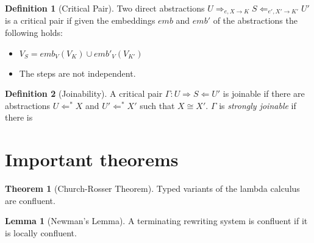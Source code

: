 \documentclass[12pt]{article}
\theoremstyle{definition}
\newtheorem{theorem}{Theorem}
\newtheorem{lemma}{Lemma}
\newtheorem{definition}{Definition}
\begin{document}
\begin{definition}[Critical Pair]
Two direct abstractions $U \Rightarrow_{e, X \rightarrow K} S \Leftarrow_{e', X' \rightarrow K'} U'$ is a critical pair if given the embeddings $emb$ and $emb'$ of the abstractions the following holds:
\begin{itemize}
\item $V_S = emb_V(V_K) \cup emb'_V(V_{K'})$
\item The steps are not independent.
\end{itemize}
\end{definition}

\begin{definition}[Joinability]
A critical pair $\Gamma: U \Rightarrow S \Leftarrow U'$ is joinable if there are abstractions $U \Leftarrow^* X$ and $U' \Leftarrow^* X'$ such that $X \cong X'$.
$\Gamma$ is \emph{strongly joinable} if there is 
\end{definition}

\section{Important theorems}

\begin{theorem}[Church-Rosser Theorem]
Typed variants of the lambda calculus are confluent.
\end{theorem}

\begin{lemma}[Newman's Lemma]
A terminating rewriting system is confluent if it is locally confluent.
\end{lemma}
\end{document}
